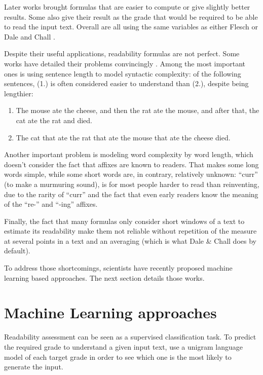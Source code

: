 \documentclass[a4paper, 11pt, onepage]{scrreprt}
\begin{document}
Later works brought formulas that are easier to compute or give
slightly better results. Some also give their result as the grade that
would be required to be able to read the input text. Overall are all
using the same variables as either Flesch or Dale and Chall
\cite{mclaughlin1969smog, kincaid1975derivation,
  chall1995readability}.

Despite their useful applications, readability formulas are not
perfect. Some works have detailed their problems convincingly
\cite{duffy1985readability, schriver2000readability}. Among the most
important ones is using sentence length to model syntactic complexity:
of the following sentences, (1.) is often considered easier to
understand than (2.), despite being lengthier:
\begin{enumerate}
\item The mouse ate the cheese, and then the rat ate the mouse, and
  after that, the cat ate the rat and died.
\item The cat that ate the rat that ate the mouse that ate the cheese
  died.
\end{enumerate}
Another important problem is modeling word complexity by word length,
which doesn't consider the fact that affixes are known to
readers. That makes some long words simple, while some short words
are, in contrary, relatively unknown: “curr” (to make a murmuring
sound), is for most people harder to read than reinventing, due to the
rarity of “curr” and the fact that even early readers know the meaning
of the “re-” and “-ing” affixes.

Finally, the fact that many formulas only consider short windows of a
text to estimate its readability make them not reliable without
repetition of the measure at several points in a text and an averaging
(which is what Dale \& Chall does by default).

To address those shortcomings, scientists have recently proposed
machine learning based approaches. The next section details those
works.

\section{Machine Learning approaches}
\label{sec:ml-approaches}

Readability assessment can be seen as a supervised classification
task. To predict the required grade to understand a given input text,
\cite{collins2004language} use a unigram language model of each target
grade in order to see which one is the most likely to generate the
input.
\end{document}
